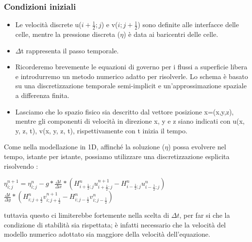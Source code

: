 \documentclass{beamer}
\begin{document}
	\begin{frame}
		\frametitle{Condizioni iniziali}
		\begin{itemize}
		\item Le velocità discrete u($i+\frac{1}{2} ; j $) e v($ i ; j+\frac{1}{2}$) sono definite alle interfacce delle celle, mentre la pressione discreta ($\eta$) è data ai baricentri delle celle.\\
		\item $\Delta$t rappresenta il passo temporale.
		\smallskip
		
		\item Ricorderemo brevemente le equazioni di governo per i flussi a superficie libera e introdurremo un metodo numerico adatto per risolverle. Lo schema è basato su una discretizzazione temporale semi-implicit e un'approssimazione spaziale a differenza finita.
		\item Lasciamo che lo spazio fisico sia descritto dal vettore posizione x=(x,y,z), mentre gli componenti di velocità in direzione x, y e z siano indicati con u(x, y, z, t), v(x, y, z, t), rispettivamente con t inizia il tempo.
		\end{itemize}
	\end{frame}


	\begin{frame}
		Come nella modellazione in 1D, affinché la soluzione ($\eta$) possa evolvere nel tempo, istante per istante, possiamo utilizzare una discretizzazione esplicita risolvendo :
		\begin{center}
				
				$ \eta_{i ; j}^{n+1} = \eta_{i ;j} ^{n}  - g*\frac{\Delta t}{\Delta x} *( H_{i+ \frac{1}{2} ; j}^n u_{i+\frac{1}{2};j}^{n+1} - H_{i-\frac{1}{2};j}^{n} u_{i-\frac{1}{2};j}^{n}) $ \\
				$\frac{\Delta t}{\Delta y} *( H_{i; j+ \frac{1}{2}}^{n} v_{i; j+\frac{1}{2}}^{n+1} - H_{i;j-\frac{1}{2}}^{n} v_{i;j-\frac{1}{2}}^{n}) $ 
		\end{center}
		tuttavia questo ci limiterebbe fortemente nella scelta di $\Delta t$, per far si che la condizione di stabilità sia rispettata; è infatti necessario che la velocità del modello numerico adottato sia maggiore della velocità dell'equazione.
	\end{frame}
\end{document}

